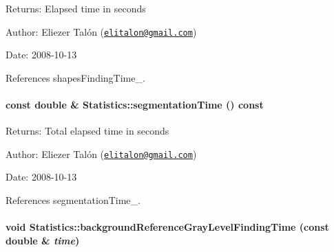 \begin{Desc}
\item[Returns:]Elapsed time in seconds\end{Desc}
\begin{Desc}
\item[Author:]Eliezer Talón (\href{mailto:elitalon@gmail.com}{\tt elitalon@gmail.com}) \end{Desc}
\begin{Desc}
\item[Date:]2008-10-13 \end{Desc}


References shapesFindingTime\_\-.\hypertarget{class_statistics_f4c992e9970bce97b9a33100db689739}{
\paragraph[segmentationTime]{\setlength{\rightskip}{0pt plus 5cm}const double \& Statistics::segmentationTime () const}\hfill}
\label{class_statistics_f4c992e9970bce97b9a33100db689739}


\begin{Desc}
\item[Returns:]Total elapsed time in seconds\end{Desc}
\begin{Desc}
\item[Author:]Eliezer Talón (\href{mailto:elitalon@gmail.com}{\tt elitalon@gmail.com}) \end{Desc}
\begin{Desc}
\item[Date:]2008-10-13 \end{Desc}


References segmentationTime\_\-.\hypertarget{class_statistics_f8a60e8a89be8fe8b2c46782681c1a2c}{
\paragraph[backgroundReferenceGrayLevelFindingTime]{\setlength{\rightskip}{0pt plus 5cm}void Statistics::backgroundReferenceGrayLevelFindingTime (const double \& {\em time})}\hfill}
\label{class_statistics_f8a60e8a89be8fe8b2c46782681c1a2c}



